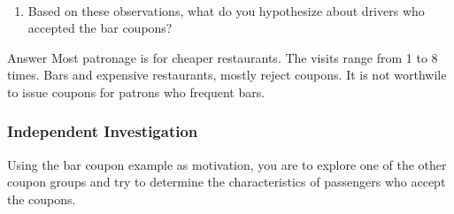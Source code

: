 \documentclass[11pt]{article}
\providecommand{\tightlist}{%
      \setlength{\itemsep}{0pt}\setlength{\parskip}{0pt}}
\begin{document}
    \begin{center}
    \end{center}
    { \hspace*{\fill} \\}
    
    \begin{enumerate}
\def\labelenumi{\arabic{enumi}.}
\setcounter{enumi}{6}
\tightlist
\item
  Based on these observations, what do you hypothesize about drivers who
  accepted the bar coupons?
\end{enumerate}

    Answer Most patronage is for cheaper restaurants. The visits range from
1 to 8 times. Bars and expensive restaurants, mostly reject coupons. It
is not worthwile to issue coupons for patrons who frequent bars.

    \subsubsection{Independent
Investigation}\label{independent-investigation}

Using the bar coupon example as motivation, you are to explore one of
the other coupon groups and try to determine the characteristics of
passengers who accept the coupons.
\end{document}
